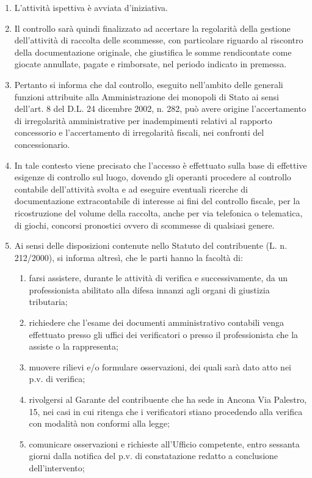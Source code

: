 \documentclass[12pt]{article}
\begin{document}
\begin{enumerate}
    \item L’attività ispettiva è avviata d’iniziativa.
    \item Il controllo sarà quindi finalizzato ad accertare la regolarità della gestione dell’attività di raccolta delle scommesse, con particolare riguardo al riscontro della documentazione originale, che giustifica le somme rendicontate come giocate annullate, pagate e rimborsate, nel periodo indicato in premessa.
    \item Pertanto si informa che dal controllo, eseguito nell’ambito delle generali funzioni attribuite alla Amministrazione dei monopoli di Stato ai sensi dell’art. 8 del D.L. 24 dicembre 2002, n. 282, può avere origine l’accertamento di irregolarità amministrative per inadempimenti relativi al rapporto concessorio e l’accertamento di irregolarità fiscali, nei confronti del concessionario.
    \item In tale contesto viene precisato che l’accesso è effettuato sulla base di effettive esigenze di controllo sul luogo, dovendo gli operanti procedere al controllo contabile dell’attività svolta e ad eseguire eventuali ricerche di documentazione extracontabile di interesse ai fini del controllo fiscale, per la ricostruzione del volume della raccolta, anche per via telefonica o telematica, di giochi, concorsi pronostici ovvero di scommesse di qualsiasi genere.
    \item Ai sensi delle disposizioni contenute nello Statuto del contribuente (L. n. 212/2000), si informa altresì, che le parti hanno la facoltà di:
    \begin{enumerate}
        \item farsi assistere, durante le attività di verifica e successivamente, da un professionista abilitato alla difesa innanzi agli organi di giustizia tributaria;
        \item richiedere che l’esame dei documenti amministrativo contabili venga effettuato presso gli uffici dei verificatori o presso il professionista che la assiste o la rappresenta;
        \item muovere rilievi e/o formulare osservazioni, dei quali sarà dato atto nei p.v. di verifica;
        \item rivolgersi al Garante del contribuente che ha sede in Ancona Via Palestro, 15, nei casi in cui ritenga che i verificatori stiano procedendo alla verifica con modalità non conformi alla legge;
        \item comunicare osservazioni e richieste all’Ufficio competente, entro sessanta giorni dalla notifica del p.v. di constatazione redatto a conclusione dell’intervento;

\end{enumerate}
\end{enumerate}
\end{document}

